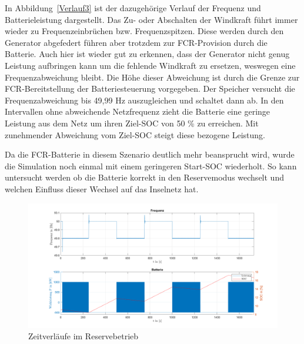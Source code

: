In Abbildung~\ref{Verlauf3} ist der dazugehörige Verlauf der Frequenz und Batterieleistung dargestellt.
Das Zu- oder Abschalten der Windkraft führt immer wieder zu Frequenzeinbrüchen bzw. Frequenzspitzen.
Diese werden durch den Generator abgefedert führen aber trotzdem zur FCR-Provision durch die Batterie.
Auch hier ist wieder gut zu erkennen, dass der Generator nicht genug Leistung aufbringen kann um die fehlende Windkraft
zu ersetzen, weswegen eine Frequenzabweichung bleibt.
Die Höhe dieser Abweichung ist durch die Grenze zur FCR-Bereitstellung der Batteriesteuerung vorgegeben.
Der Speicher versucht die Frequenzabweichung bis 49,99 Hz auszugleichen und schaltet dann ab.
In den Intervallen ohne abweichende Netzfrequenz zieht die Batterie eine geringe Leistung aus dem Netz um 
ihren Ziel-SOC von 50 \% zu erreichen.
Mit zunehmender Abweichung vom Ziel-SOC steigt diese bezogene Leistung.

Da die FCR-Batterie in diesem Szenario deutlich mehr beansprucht wird, wurde die Simulation noch einmal
mit einem geringeren Start-SOC wiederholt.
So kann untersucht werden ob die Batterie korrekt in den Reservemodus wechselt
und welchen Einfluss dieser Wechsel auf das Inselnetz hat.

\begin{figure}
	\centering
	\includegraphics[width=14cm]{Abbildungen/FreqBat4.png}
	\caption{Zeitverläufe im Reservebetrieb}\label{Verlauf4}
\end{figure}

